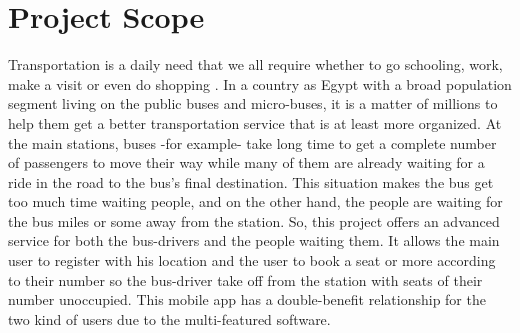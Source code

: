 \section{Project Scope}


\hspace{2cm} Transportation is a daily need that we all require whether to go schooling, work, make a visit or even do shopping . In a country as Egypt with a broad population segment living on the public buses and micro-buses, it is a matter of millions to help them get a better transportation service that is at least more organized.
At the main stations, buses -for example- take long time to get a complete number of passengers to move their way while many of them are already waiting for a ride in the road to the bus’s final destination. This situation makes the bus get too much time waiting people, and on the other hand, the people are waiting for the bus miles or some away from the station. So, this project offers an advanced service for both the bus-drivers and the people waiting them. It allows the main user to register with his location and the user to book a seat or more according to their number so the bus-driver take off from the station with seats of their number unoccupied. 
This mobile app has a double-benefit relationship for the two kind of users due to the multi-featured software. 

